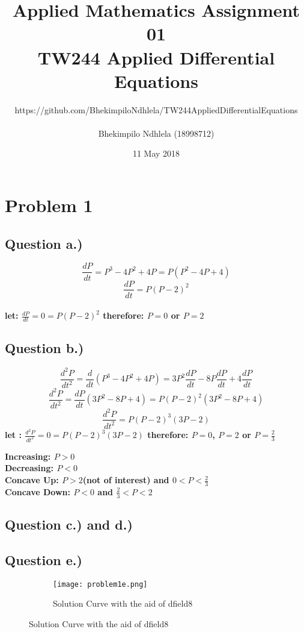 \documentclass{article}
\title{Applied Mathematics  Assignment 01 \\ TW244 Applied Differential Equations}
\author{https://github.com/BhekimpiloNdhlela/TW244AppliedDifferentialEquations \\ \\ Bhekimpilo Ndhlela (18998712)}
\date{11 May 2018}
\begin{document}
\maketitle
\pagebreak

\section*{Problem 1}
\subsection*{Question a.)}
\begin{center}
\[\frac{dP}{dt} = P^3 - 4P^2 + 4P = P(P^2 - 4P + 4)\] \[\frac{dP}{dt} = P(P -2)^2\] \\  \textbf{let: $\frac{dP}{dt} = 0 = P(P - 2)^2 $ therefore: $P = 0$ or $P = 2$} 
\end{center}

\subsection*{Question b.)}
\begin{center}
\[\frac{d^2P}{dt^2} = \frac{d}{dt}(P^3 - 4P^2 + 4P) = 3P^2\frac{dP}{dt} - 8P\frac{dP}{dt} + 4\frac{dP}{dt}\]
\[\frac{d^2P}{dt^2} = \frac{dP}{dt}(3P^2 - 8P + 4) = P(P -2)^2(3P^2 - 8P + 4)\]
\[\frac{d^2P}{dt^2} =  P(P -2)^3(3P - 2)\] \textbf{let : $\frac{d^2P}{dt^2} = 0 = P(P -2)^3(3P - 2)$ therefore: $P = 0$, $P = 2$ or $P = \frac{2}{3}$}
\end{center}
\textbf{Increasing: $P > 0$ \\ }
\textbf{Decreasing: $P < 0$ \\}
\textbf{Concave Up: $P > 2$(not of interest) and $0 < P < \frac{2}{3}$ \\}
\textbf{Concave Down: $P < 0$ and $ \frac{2}{3} < P < 2$}

\subsection*{Question c.) and d.)}
\pagebreak
\subsection*{Question e.)}
\begin{figure}[h!]
  \centering
  \begin{subfigure}{\linewidth}
    \texttt{[image: problem1e.png]}
    \caption{Solution Curve with the aid of dfield8}
  \end{subfigure}
\end{figure}
\pagebreak
\end{document}
